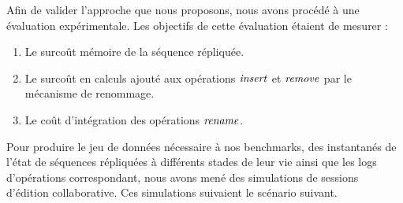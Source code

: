 \label{sec:validation-experimentations}

Afin de valider l'approche que nous proposons, nous avons procédé à une évaluation expérimentale.
Les objectifs de cette évaluation étaient de mesurer :
\begin{enumerate}
  \item Le surcoût mémoire de la séquence répliquée.
  \item Le surcoût en calculs ajouté aux opérations $\mathit{insert}$ et $\mathit{remove}$ par le mécanisme de renommage.
  \item Le coût d'intégration des opérations $\mathit{rename}$.
\end{enumerate}

Pour produire le jeu de données nécessaire à nos benchmarks, \ie des instantanés de l'état de séquences répliquées à différents stades de leur vie ainsi que les logs d'opérations correspondant, nous avons mené des simulations de sessions d'édition collaborative.
Ces simulations suivaient le scénario suivant.
